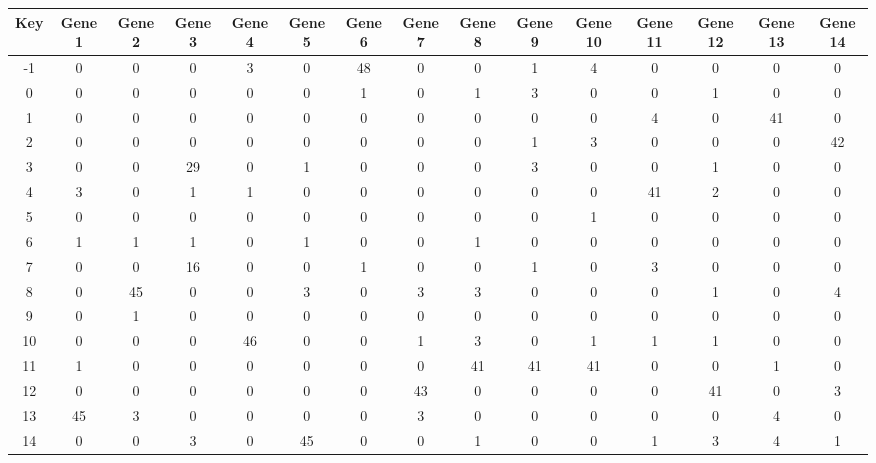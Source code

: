 \begin{tabular}{|c|c|c|c|c|c|c|c|c|c|c|c|c|c|c|}
\hline
Key & Gene 1 & Gene 2 & Gene 3 & Gene 4 & Gene 5 & Gene 6 & Gene 7 & Gene 8 & Gene 9 & Gene 10 & Gene 11 & Gene 12 & Gene 13 & Gene 14 \\
\hline
-1 & 0 & 0 & 0 & 3 & 0 & 48 & 0 & 0 & 1 & 4 & 0 & 0 & 0 & 0 \\
0 & 0 & 0 & 0 & 0 & 0 & 1 & 0 & 1 & 3 & 0 & 0 & 1 & 0 & 0 \\
1 & 0 & 0 & 0 & 0 & 0 & 0 & 0 & 0 & 0 & 0 & 4 & 0 & 41 & 0 \\
2 & 0 & 0 & 0 & 0 & 0 & 0 & 0 & 0 & 1 & 3 & 0 & 0 & 0 & 42 \\
3 & 0 & 0 & 29 & 0 & 1 & 0 & 0 & 0 & 3 & 0 & 0 & 1 & 0 & 0 \\
4 & 3 & 0 & 1 & 1 & 0 & 0 & 0 & 0 & 0 & 0 & 41 & 2 & 0 & 0 \\
5 & 0 & 0 & 0 & 0 & 0 & 0 & 0 & 0 & 0 & 1 & 0 & 0 & 0 & 0 \\
6 & 1 & 1 & 1 & 0 & 1 & 0 & 0 & 1 & 0 & 0 & 0 & 0 & 0 & 0 \\
7 & 0 & 0 & 16 & 0 & 0 & 1 & 0 & 0 & 1 & 0 & 3 & 0 & 0 & 0 \\
8 & 0 & 45 & 0 & 0 & 3 & 0 & 3 & 3 & 0 & 0 & 0 & 1 & 0 & 4 \\
9 & 0 & 1 & 0 & 0 & 0 & 0 & 0 & 0 & 0 & 0 & 0 & 0 & 0 & 0 \\
10 & 0 & 0 & 0 & 46 & 0 & 0 & 1 & 3 & 0 & 1 & 1 & 1 & 0 & 0 \\
11 & 1 & 0 & 0 & 0 & 0 & 0 & 0 & 41 & 41 & 41 & 0 & 0 & 1 & 0 \\
12 & 0 & 0 & 0 & 0 & 0 & 0 & 43 & 0 & 0 & 0 & 0 & 41 & 0 & 3 \\
13 & 45 & 3 & 0 & 0 & 0 & 0 & 3 & 0 & 0 & 0 & 0 & 0 & 4 & 0 \\
14 & 0 & 0 & 3 & 0 & 45 & 0 & 0 & 1 & 0 & 0 & 1 & 3 & 4 & 1 \\
\hline
\end{tabular}